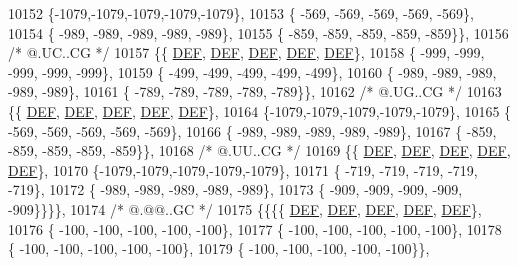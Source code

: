 \begin{DoxyCode}
10152 \{-1079,-1079,-1079,-1079,-1079\},
10153 \{ -569, -569, -569, -569, -569\},
10154 \{ -989, -989, -989, -989, -989\},
10155 \{ -859, -859, -859, -859, -859\}\},
10156 \textcolor{comment}{/*  @.UC..CG */}
10157 \{\{  \mbox{\hyperlink{1_88_84__epars_8h_a397419fc12b37ed479c8abb9d444d843}{DEF}},  \mbox{\hyperlink{1_88_84__epars_8h_a397419fc12b37ed479c8abb9d444d843}{DEF}},  \mbox{\hyperlink{1_88_84__epars_8h_a397419fc12b37ed479c8abb9d444d843}{DEF}},  \mbox{\hyperlink{1_88_84__epars_8h_a397419fc12b37ed479c8abb9d444d843}{DEF}},  \mbox{\hyperlink{1_88_84__epars_8h_a397419fc12b37ed479c8abb9d444d843}{DEF}}\},
10158 \{ -999, -999, -999, -999, -999\},
10159 \{ -499, -499, -499, -499, -499\},
10160 \{ -989, -989, -989, -989, -989\},
10161 \{ -789, -789, -789, -789, -789\}\},
10162 \textcolor{comment}{/*  @.UG..CG */}
10163 \{\{  \mbox{\hyperlink{1_88_84__epars_8h_a397419fc12b37ed479c8abb9d444d843}{DEF}},  \mbox{\hyperlink{1_88_84__epars_8h_a397419fc12b37ed479c8abb9d444d843}{DEF}},  \mbox{\hyperlink{1_88_84__epars_8h_a397419fc12b37ed479c8abb9d444d843}{DEF}},  \mbox{\hyperlink{1_88_84__epars_8h_a397419fc12b37ed479c8abb9d444d843}{DEF}},  \mbox{\hyperlink{1_88_84__epars_8h_a397419fc12b37ed479c8abb9d444d843}{DEF}}\},
10164 \{-1079,-1079,-1079,-1079,-1079\},
10165 \{ -569, -569, -569, -569, -569\},
10166 \{ -989, -989, -989, -989, -989\},
10167 \{ -859, -859, -859, -859, -859\}\},
10168 \textcolor{comment}{/*  @.UU..CG */}
10169 \{\{  \mbox{\hyperlink{1_88_84__epars_8h_a397419fc12b37ed479c8abb9d444d843}{DEF}},  \mbox{\hyperlink{1_88_84__epars_8h_a397419fc12b37ed479c8abb9d444d843}{DEF}},  \mbox{\hyperlink{1_88_84__epars_8h_a397419fc12b37ed479c8abb9d444d843}{DEF}},  \mbox{\hyperlink{1_88_84__epars_8h_a397419fc12b37ed479c8abb9d444d843}{DEF}},  \mbox{\hyperlink{1_88_84__epars_8h_a397419fc12b37ed479c8abb9d444d843}{DEF}}\},
10170 \{-1079,-1079,-1079,-1079,-1079\},
10171 \{ -719, -719, -719, -719, -719\},
10172 \{ -989, -989, -989, -989, -989\},
10173 \{ -909, -909, -909, -909, -909\}\}\}\},
10174 \textcolor{comment}{/*  @.@@..GC */}
10175 \{\{\{\{  \mbox{\hyperlink{1_88_84__epars_8h_a397419fc12b37ed479c8abb9d444d843}{DEF}},  \mbox{\hyperlink{1_88_84__epars_8h_a397419fc12b37ed479c8abb9d444d843}{DEF}},  \mbox{\hyperlink{1_88_84__epars_8h_a397419fc12b37ed479c8abb9d444d843}{DEF}},  \mbox{\hyperlink{1_88_84__epars_8h_a397419fc12b37ed479c8abb9d444d843}{DEF}},  \mbox{\hyperlink{1_88_84__epars_8h_a397419fc12b37ed479c8abb9d444d843}{DEF}}\},
10176 \{ -100, -100, -100, -100, -100\},
10177 \{ -100, -100, -100, -100, -100\},
10178 \{ -100, -100, -100, -100, -100\},
10179 \{ -100, -100, -100, -100, -100\}\},

\end{DoxyCode}
